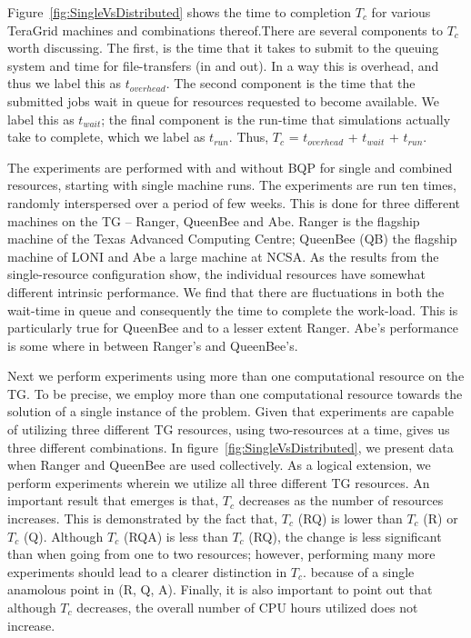 \documentclass{acm_proc_article-sp}
\newcommand{\tc}{$T_c$ }
\newcommand{\tcnsp}{$T_c$}
\begin{document}
Figure~\ref{fig:SingleVsDistributed} shows the time to completion \tc
for various TeraGrid machines and combinations thereof.There are
several components to \tc worth discussing. The first, is the time
that it takes to submit to the queuing system and time for
file-transfers (in and out). In a way this is overhead, and thus we
label this as $t_{overhead}$.  The second component is the time that
the submitted jobs wait in queue for resources requested to become
available. We label this as $t_{wait}$; the final component is the
run-time that simulations actually take to complete, which we label as
$t_{run}$. Thus, \tc = $t_{overhead}$ + $t_{wait}$ + $t_{run}$.

The experiments are performed with and without BQP for single and
combined resources, starting with single machine runs. The experiments
are run ten times, randomly interspersed over a period of few
weeks. This is done for three different machines on the TG -- Ranger,
QueenBee and Abe.  Ranger is the flagship machine of the Texas
Advanced Computing Centre; QueenBee (QB) the flagship machine of LONI
and Abe a large machine at NCSA.  As the results from the
single-resource configuration show, the individual resources have
somewhat different intrinsic performance. We find that there are
fluctuations in both the wait-time in queue and consequently the time
to complete the work-load. This is particularly true for QueenBee and
to a lesser extent Ranger. Abe's performance is some where in between
Ranger's and QueenBee's.

Next we perform experiments using more than one computational resource
on the TG. To be precise, we employ more than one computational
resource towards the solution of a single instance of the problem.
Given that experiments are capable of utilizing three different TG
resources, using two-resources at a time, gives us three different
combinations. In figure~\ref{fig:SingleVsDistributed}, we present data
when Ranger and QueenBee are used collectively.  As a logical
extension, we perform experiments wherein we utilize all three
different TG resources. An important result that emerges is that, \tc
decreases as the number of resources increases. This is demonstrated
by the fact that, \tc (RQ) is lower than \tc (R) or \tc (Q).  Although
\tc (RQA) is less than \tc (RQ), the change is less significant than
when going from one to two resources; however, performing many more
experiments should lead to a clearer distinction in \tcnsp. because of
a single anamolous point in (R, Q, A).  Finally, it is also important
to point out that although \tc decreases, the overall number of CPU
hours utilized does not increase.
\end{document}
